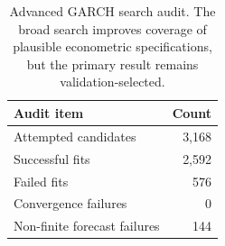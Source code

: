 \begin{table}[!t]
\centering
\caption{Advanced GARCH search audit. The broad search improves coverage of plausible econometric specifications, but the primary result remains validation-selected.}
\label{tab:advanced-search-audit}
\scriptsize
\setlength{\tabcolsep}{4pt}
\begin{tabular}{@{}L{0.58\columnwidth}r@{}}
\toprule
Audit item & Count \\
\midrule
Attempted candidates & 3,168 \\
Successful fits & 2,592 \\
Failed fits & 576 \\
Convergence failures & 0 \\
Non-finite forecast failures & 144 \\
\bottomrule
\end{tabular}
\end{table}
